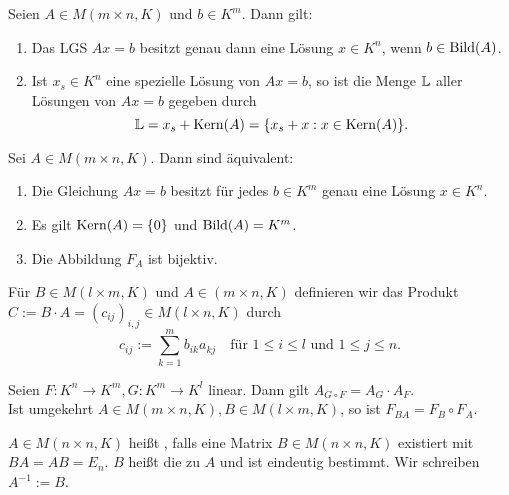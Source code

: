 \setcounter{definition}{7}
\begin{satz}
	\label{satz:I.6.8}
	Seien $A \in M(m\times n,K)$ und $b \in K^m$.
	Dann gilt:
	\begin{enumerate}[(1)]
		\item Das LGS $Ax = b$ besitzt genau dann eine Lösung $x \in K^n$, wenn $b \in \operatorname{Bild}(A)$.
		\item Ist $x_s \in K^n$ eine spezielle Lösung von $Ax=b$, so ist die Menge $\mathbb{L}$ aller Lösungen von $Ax=b$ gegeben durch
		\[
			\mathbb{L} = x_s + \operatorname{Kern}(A) = \{x_s + x : x \in \operatorname{Kern}(A)\}.
		\]
	\end{enumerate}
\end{satz}
\newpage
\begin{korollar}
	\label{folg:I.6.9}
	Sei $A \in M(m\times n,K)$.
	Dann sind äquivalent:
	\begin{enumerate}[(1)]
		\item Die Gleichung $Ax=b$ besitzt für jedes $b \in K^m$ genau eine Lösung $x \in K^n$.
		\item Es gilt $\operatorname{Kern}(A) = \{0\}$ und $\operatorname{Bild}(A) = K^m$.
		\item Die Abbildung $F_A$ ist bijektiv.
	\end{enumerate}
\end{korollar}

\setcounter{definition}{12}
\begin{definition}[Matrixmultiplikation]
	\label{def:I.6.13}
	Für $B \in M(l \times m,K)$ und $A \in (m \times n,K)$ definieren wir das Produkt $C := B \cdot A = (c_{ij})_{i,j} \in M(l \times n,K)$ durch 
	\[
		c_{ij} := \sum_{k=1}^{m} b_{ik}a_{kj} \quad \text{für } 1 \leq i \leq l \text{ und } 1 \leq j \leq n.
	\]
\end{definition}

\begin{satz}
	\label{satz:I.6.14}
	Seien $F \colon K^n \rightarrow K^m, G \colon K^m \rightarrow K^l$ linear.
	Dann gilt $A_{G \circ F} = A_G \cdot A_F$. \\
	Ist umgekehrt $A \in M(m \times n,K), B \in M(l \times m,K)$, so ist $F_{BA} = F_B \circ F_A$.
\end{satz}

\setcounter{definition}{16}
\begin{definition}
	\label{def:I.6.17}
	$A \in M(n \times n,K)$ heißt , falls eine Matrix $B \in M(n\times n,K)$ existiert mit $BA = AB = E_n$.
	$B$ heißt die zu $A$  und ist eindeutig bestimmt.
	Wir schreiben $A^{-1} := B$.
\end{definition}

